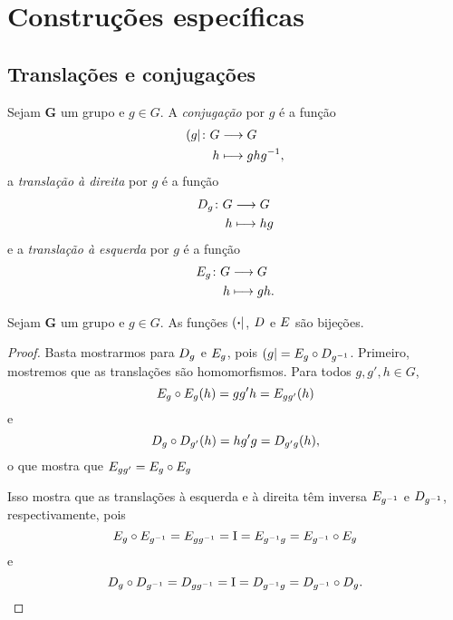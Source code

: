 \cleardoublepage
\section{Construções específicas}

\subsection{Translações e conjugações}

\begin{definition}
Sejam $\bm G$ um grupo e $g \in G$. A \emph{conjugação} por $g$ é a função
	\begin{align*}
	{\left({g}\right|}\colon {G} &\longrightarrow {G} \\{h} &\longmapsto ghg^{-1},
	\end{align*}
a \emph{translação à direita} por $g$ é a função
	\begin{align*}
	{D_{g}}\colon {G} &\longrightarrow {G} \\{h} &\longmapsto hg
	\end{align*}
e a \emph{translação à esquerda} por $g$ é a função
	\begin{align*}
	{E_{g}}\colon {G} &\longrightarrow {G} \\{h} &\longmapsto gh.
	\end{align*}
\end{definition}

\begin{proposition}
Sejam $\bm G$ um grupo e $g \in G$. As funções $\left({\bm{\cdot}}\right|$, $D_{}$ e $E_{}$ são bijeções.
\end{proposition}
\begin{proof}
Basta mostrarmos para $D_{g}$ e $E_{g}$, pois $\left({g}\right| = E_{g} \circ D_{g^{-1}}$. Primeiro, mostremos que as translações são homomorfismos. Para todos $g,g',h \in G$,
	\begin{equation*}
		E_{g} \circ E_{g}(h) = gg'h = E_{gg'}(h)
	\end{equation*}
e
	\begin{equation*}
		D_{g} \circ D_{g'}(h) = hg'g = D_{g'g}(h),
	\end{equation*}
o que mostra que $E_{gg'} = E_{g} \circ E_{g}$

Isso mostra que as translações à esquerda e à direita têm inversa $E_{g^{-1}}$ e $D_{g^{-1}}$, respectivamente, pois
	\begin{equation*}
		E_{g} \circ E_{g^{-1}} = E_{gg^{-1}} = \mathrm{I} = E_{g^{-1} g} = E_{g^{-1}} \circ E_{g}
	\end{equation*}
e
	\begin{equation*}
		D_{g} \circ D_{g^{-1}} = D_{gg^{-1}} = \mathrm{I} = D_{g^{-1} g} = D_{g^{-1}} \circ D_{g}.
	\end{equation*}
\end{proof}

